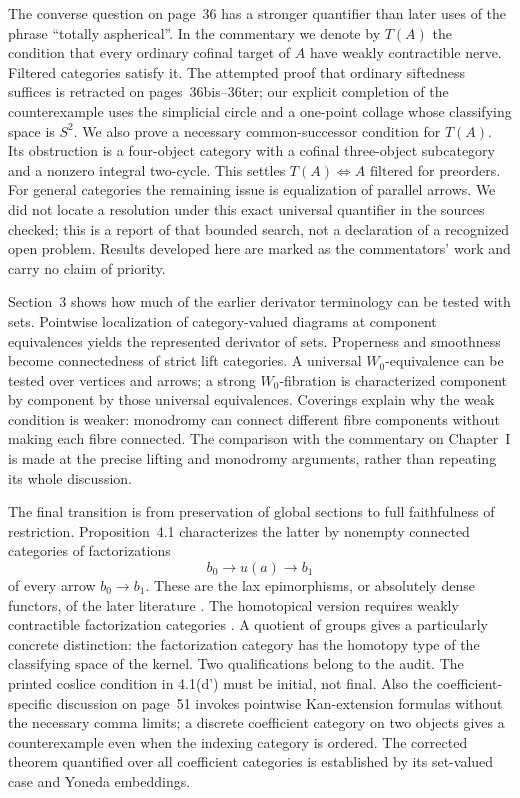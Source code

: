 The converse question on page~36 has a stronger quantifier than later uses of the phrase ``totally aspherical''. In the commentary we denote by $T(A)$ the condition that every ordinary cofinal target of $A$ have weakly contractible nerve. Filtered categories satisfy it. The attempted proof that ordinary siftedness suffices is retracted on pages~36bis--36ter; our explicit completion of the counterexample uses the simplicial circle and a one-point collage whose classifying space is $S^2$. We also prove a necessary common-successor condition for $T(A)$. Its obstruction is a four-object category with a cofinal three-object subcategory and a nonzero integral two-cycle. This settles $T(A)\Leftrightarrow A\text{ filtered}$ for preorders. For general categories the remaining issue is equalization of parallel arrows. We did not locate a resolution under this exact universal quantifier in the sources checked; this is a report of that bounded search, not a declaration of a recognized open problem. Results developed here are marked as the commentators' work and carry no claim of priority.

Section~3 shows how much of the earlier derivator terminology can be tested with sets. Pointwise localization of category-valued diagrams at component equivalences yields the represented derivator of sets. Properness and smoothness become connectedness of strict lift categories. A universal $W_0$-equivalence can be tested over vertices and arrows; a strong $W_0$-fibration is characterized component by component by those universal equivalences. Coverings explain why the weak condition is weaker: monodromy can connect different fibre components without making each fibre connected. The comparison with the commentary on Chapter~I is made at the precise lifting and monodromy arguments, rather than repeating its whole discussion.

The final transition is from preservation of global sections to full faithfulness of restriction. Proposition~4.1 characterizes the latter by nonempty connected categories of factorizations
\[
 b_0\longrightarrow u(a)\longrightarrow b_1
\]
of every arrow $b_0\to b_1$. These are the lax epimorphisms, or absolutely dense functors, of the later literature \citep{AdamekElBashirSobralVelebil2001}. The homotopical version requires weakly contractible factorization categories \citep[Theorem~6.10]{GrothStovicek2016Trees}. A quotient of groups gives a particularly concrete distinction: the factorization category has the homotopy type of the classifying space of the kernel. Two qualifications belong to the audit. The printed coslice condition in 4.1(d') must be initial, not final. Also the coefficient-specific discussion on page~51 invokes pointwise Kan-extension formulas without the necessary comma limits; a discrete coefficient category on two objects gives a counterexample even when the indexing category is ordered. The corrected theorem quantified over all coefficient categories is established by its set-valued case and Yoneda embeddings.

